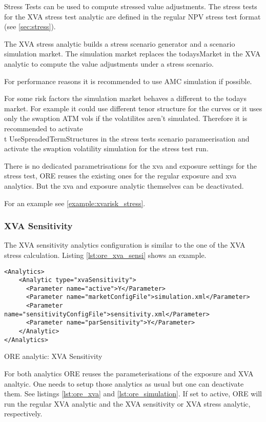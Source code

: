 {Stress Tests can be used to compute stressed value adjustments. The stress tests for the XVA stress test analytic are
defined in the regular NPV stress test format (see \ref{sec:stress}).

The XVA stress analytic builds a stress scenario generator and a scenario simulation market. The simulation market
replaces the todaysMarket in the XVA analytic to compute the value adjustments under a stress scenario.

For performance reasons it is recommended to use AMC simulation if possible. 

For some risk factors the simulation market behaves a different to the todays market. For example it could use different
tenor structure for the curves or it uses only the swaption ATM vols if the volatilites aren't simulated.
Therefore it is recommended to activate {\\t UseSpreadedTermStructures} in the stress tests scenario parameerisation 
and activate the swaption volatility simulation for the stress test run.

There is no dedicated parametrisations for the xva and exposure settings for the stress test, ORE reuses the existing
ones for the regular exposure and xva analytics. But the xva and exposure analytic themselves can be deactivated.

For an example see \ref{example:xvarisk_stress}.

\subsubsection{XVA Sensitivity}

The XVA sensitivity analytics configuration is similar to the one of the XVA stress calculation. Listing \ref{lst:ore_xva_sensi}
shows an example.

\begin{listing}[H]
\begin{verbatim}
<Analytics>
    <Analytic type="xvaSensitivity">
      <Parameter name="active">Y</Parameter>
      <Parameter name="marketConfigFile">simulation.xml</Parameter>
      <Parameter name="sensitivityConfigFile">sensitivity.xml</Parameter>
      <Parameter name="parSensitivity">Y</Parameter>
    </Analytic>
</Analytics>
\end{verbatim}
\caption{ORE analytic: XVA Sensitivity}
\label{lst:ore_xva_sensi}
\end{listing}

For both analytics ORE reuses the parameterisations of the exposure and XVA analtyic. One needs to setup those
analytics as usual but one can deactivate them. See listings \ref{lst:ore_xva} and \ref{lst:ore_simulation}.
If set to active, ORE will run the regular XVA analytic and the XVA sensitivity or XVA stress analytic, respectively.

}
